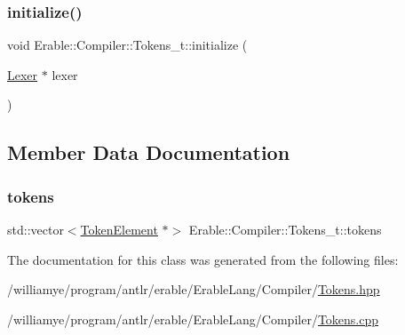 \mbox{\label{class_erable_1_1_compiler_1_1_tokens__t_a26021ac374aac74592831644583b0bbe}} 
\subsubsection{\texorpdfstring{initialize()}{initialize()}}
{\footnotesize\ttfamily void Erable\+::\+Compiler\+::\+Tokens\+\_\+t\+::initialize (\begin{DoxyParamCaption}\item[{\mbox{\hyperlink{class_lexer}{Lexer}} $\ast$}]{lexer }\end{DoxyParamCaption})}



\subsection{Member Data Documentation}
\mbox{\label{class_erable_1_1_compiler_1_1_tokens__t_a9c933a1377e829ec2b6b84a7e0417d98}} 
\subsubsection{\texorpdfstring{tokens}{tokens}}
{\footnotesize\ttfamily std\+::vector$<$\mbox{\hyperlink{class_erable_1_1_compiler_1_1_token_element}{Token\+Element}} $\ast$$>$ Erable\+::\+Compiler\+::\+Tokens\+\_\+t\+::tokens}



The documentation for this class was generated from the following files\+:\begin{DoxyCompactItemize}
\item 
/williamye/program/antlr/erable/\+Erable\+Lang/\+Compiler/\mbox{\hyperlink{_tokens_8hpp}{Tokens.\+hpp}}\item 
/williamye/program/antlr/erable/\+Erable\+Lang/\+Compiler/\mbox{\hyperlink{_tokens_8cpp}{Tokens.\+cpp}}\end{DoxyCompactItemize}
